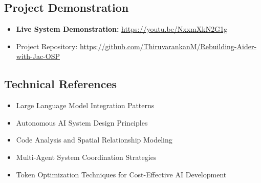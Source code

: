 \documentclass[12pt,a4paper]{article}
\begin{document}
\subsection{Project Demonstration}
\begin{itemize}
    \item \textbf{Live System Demonstration:} \url{https://youtu.be/NxxmXkN2G1g}
    \item Project Repository: \url{https://github.com/ThiruvarankanM/Rebuilding-Aider-with-Jac-OSP}
\end{itemize}

\subsection{Technical References}
\begin{itemize}
    \item Large Language Model Integration Patterns
    \item Autonomous AI System Design Principles  
    \item Code Analysis and Spatial Relationship Modeling
    \item Multi-Agent System Coordination Strategies
    \item Token Optimization Techniques for Cost-Effective AI Development
\end{itemize}
\end{document}
